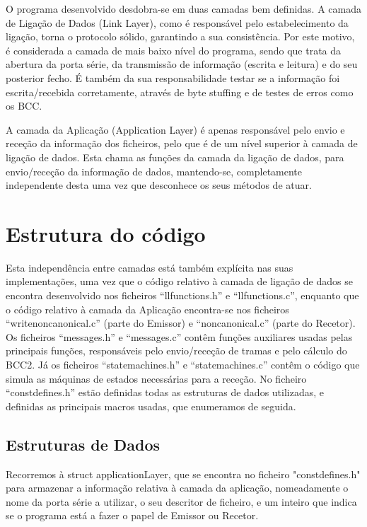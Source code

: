 \documentclass[article, a4paper, 11pt, oneside]{memoir}
\begin{document}
O programa desenvolvido desdobra-se em duas camadas bem definidas. A camada de Ligação de Dados (Link Layer), como é responsável 
pelo estabelecimento da ligação, 
torna o protocolo sólido, garantindo a sua consistência. 
Por este motivo, é considerada a camada de mais baixo nível do programa, sendo que trata da abertura da porta série, 
da transmissão de informação (escrita e leitura) e do seu posterior fecho. 
É também da sua responsabilidade testar se a informação foi escrita/recebida corretamente, através de byte stuffing e de testes de erros como os BCC.

A camada da Aplicação (Application Layer) é apenas responsável pelo envio e receção da informação dos ficheiros, pelo que é de um nível superior à camada de ligação de dados.
Esta chama as funções da camada da ligação de dados, para envio/receção da informação de dados, 
mantendo-se, completamente independente desta uma vez que desconhece os seus métodos de atuar.

\chapter[Estrutura do código][Estrutura do código]{Estrutura do código} \label{\thechapter}

Esta independência entre camadas está também explícita nas suas implementações, uma vez que o código relativo à camada de ligação de dados se 
encontra desenvolvido nos ficheiros “llfunctions.h” e “llfunctions.c”, enquanto que o código relativo à camada da Aplicação encontra-se nos ficheiros 
“writenoncanonical.c” (parte do Emissor) e “noncanonical.c” (parte do Recetor). Os ficheiros “messages.h” e “messages.c” contêm funções auxiliares 
usadas pelas principais funções, responsáveis pelo envio/receção de tramas e pelo cálculo do BCC2. 
Já os ficheiros “state\textunderscore machines.h” e “state\textunderscore machines.c” contêm o código que simula as máquinas de estados necessárias para a receção.
No ficheiro “const\textunderscore defines.h” estão definidas todas as estruturas de dados utilizadas, e definidas as principais macros usadas, que enumeramos de seguida.

\section{Estruturas de Dados}
Recorremos à struct applicationLayer, que se encontra no ficheiro "const\textunderscore defines.h" para armazenar a informação relativa à camada da aplicação, nomeadamente o nome da porta série a utilizar, 
o seu descritor de ficheiro, e um inteiro que indica se o programa está a fazer o papel de Emissor ou Recetor.
\end{document}
